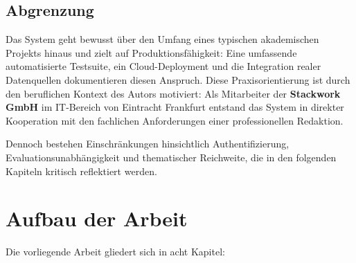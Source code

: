 \documentclass[12pt,a4paper,notitlepage,ngerman]{report}
\begin{document}
\subsection{Abgrenzung}

Das System geht bewusst über den Umfang eines typischen akademischen Projekts hinaus und zielt auf Produktionsfähigkeit: Eine umfassende automatisierte Testsuite, ein Cloud-Deployment und die Integration realer Datenquellen dokumentieren diesen Anspruch. Diese Praxisorientierung ist durch den beruflichen Kontext des Autors motiviert: Als Mitarbeiter der \textbf{Stackwork GmbH} im IT-Bereich von Eintracht Frankfurt entstand das System in direkter Kooperation mit den fachlichen Anforderungen einer professionellen Redaktion.

Dennoch bestehen Einschränkungen hinsichtlich Authentifizierung, Evaluationsunabhängigkeit und thematischer Reichweite, die in den folgenden Kapiteln kritisch reflektiert werden.

\section{Aufbau der Arbeit}

Die vorliegende Arbeit gliedert sich in acht Kapitel:
\end{document}
